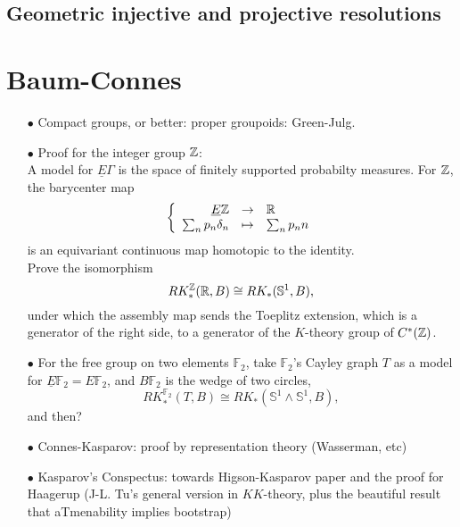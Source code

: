 \subsection*{Geometric injective and projective resolutions}

\section{Baum-Connes}

\begin{itemize}
\item[$\bullet$] Compact groups, or better: proper groupoids: Green-Julg. \\
\item[$\bullet$] Proof for the integer group $\mathbb Z$: \\

A model for $\underline E \Gamma$ is the space of finitely supported probabilty measures. For $\mathbb Z$, the barycenter map 
\[\left\{ \begin{array}{rcl}
\underline E \mathbb Z & \rightarrow & \mathbb R \\ 
\sum_{n} p_n \delta_n & \mapsto & \sum_n p_n n \end{array}\right.\]
is an equivariant continuous map homotopic to the identity.\\

Prove the isomorphism
\[ RK_*^\mathbb Z(\mathbb R, B) \cong RK_*(\mathbb{S}^1,B),\]
under which the assembly map sends the Toeplitz extension, which is a generator of the right side, to a generator of the $K$-theory group of $C^*(\mathbb Z)$.\\

\item[$\bullet$] For the free group on two elements $\mathbb F_2$, take $\mathbb F_2$'s Cayley graph $T$ as a model for $\underline E \mathbb F_2 =E\mathbb F_2$, and $B\mathbb F_2$ is the wedge of two circles,
\[ RK_*^{\mathbb F_2}(T, B) \cong RK_*(\mathbb{S}^1 \wedge \mathbb{S}^1 ,B),\]
and then?\\
	
\item[$\bullet$] Connes-Kasparov: proof by representation theory (Wasserman, etc)\\
\item[$\bullet$] Kasparov's Conspectus: towards Higson-Kasparov paper and the proof for Haagerup (J-L. Tu's general version in $KK$-theory, plus the beautiful result that aTmenability implies bootstrap)\\


\end{itemize}
